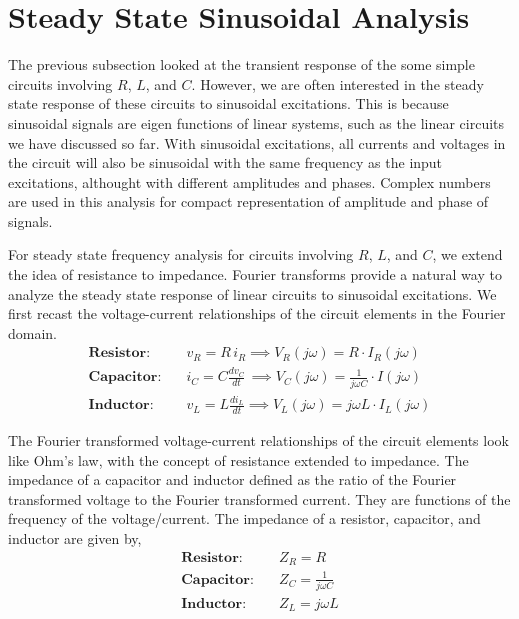 \section{Steady State Sinusoidal Analysis}
The previous subsection looked at the transient response of the some simple circuits involving $R$, $L$, and $C$. However, we are often interested in the steady state response of these circuits to sinusoidal excitations. This is because sinusoidal signals are eigen functions of linear systems, such as the linear circuits we have discussed so far. With sinusoidal excitations, all currents and voltages in the circuit will also be sinusoidal with the same frequency as the input excitations, althought with different amplitudes and phases. Complex numbers are used in this analysis for compact representation of amplitude and phase of signals. 

For steady state frequency analysis for circuits involving $R$, $L$, and $C$, we extend the idea of resistance to impedance. Fourier transforms provide a natural way to analyze the steady state response of linear circuits to sinusoidal excitations. We first recast the voltage-current relationships of the circuit elements in the Fourier domain. 
\begin{equation}
    \begin{split}
        \textbf{Resistor:} \quad & v_R = R \, i_R \implies V_R\left(j\omega\right) = R \cdot I_R\left(j\omega\right)\\
        \textbf{Capacitor:} \quad & i_C = C\frac{d v_C}{dt} \, \implies V_C\left(j\omega\right) = \frac{1}{j\omega C} \cdot I\left(j\omega\right)\\
        \textbf{Inductor:} \quad & v_L = L \frac{d i_L}{dt} \implies V_L\left(j\omega\right) = j\omega L \cdot I_L\left(j \omega \right)
    \end{split}
    \label{eq:02-34}
\end{equation}

The Fourier transformed voltage-current relationships of the circuit elements look like Ohm's law, with the concept of resistance extended to impedance. The impedance of a capacitor and inductor defined as the ratio of the Fourier transformed voltage to the Fourier transformed current. They are functions of the frequency of the voltage/current. The impedance of a resistor, capacitor, and inductor are given by,
\begin{equation}
    \begin{split}
        \textbf{Resistor:} \quad & Z_R = R\\
        \textbf{Capacitor:} \quad & Z_C = \frac{1}{j\omega C}\\
        \textbf{Inductor:} \quad & Z_L = j\omega L
    \end{split}
    \label{eq:02-35}
\end{equation}

